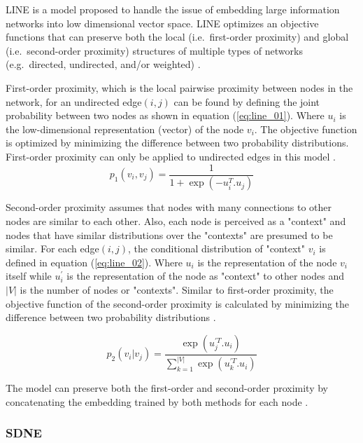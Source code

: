 \ac{LINE} is a model proposed to handle the issue of embedding large information networks into low dimensional vector space.
\ac{LINE} optimizes an objective functions that can preserve both the local (i.e.~first-order proximity) and global (i.e.~second-order proximity) structures of multiple types of networks (e.g.~directed, undirected, and/or weighted) \cite{tang_line:_2015}.

First-order proximity, which is the local pairwise proximity between nodes in the network, for an undirected edge$(i,j)$ can be found by defining the joint probability between two nodes as shown in equation (\ref{eq:line_01}).
Where $u_{i}$ is the low-dimensional representation (vector) of the node $v_{i}$.
The objective function is optimized by minimizing the difference between two probability distributions.
First-order proximity can only be applied to undirected edges in this model \cite{tang_line:_2015}.
\begin{equation}
    \label{eq:line_01}
    p_{1}(v_{i}, v_{j}) = \frac{1}{1+ \exp{(-u_{i}^T .u_{j})}}
\end{equation}

Second-order proximity assumes that nodes with many connections to other nodes are similar to each other.
Also, each node is perceived as a "context" and nodes that have similar distributions over the "contexts" are presumed to be similar.
For each edge$(i,j)$, the conditional distribution of "context" $v_{i}$ is defined in equation (\ref{eq:line_02}).
Where $u_{i}$ is the representation of the node $v_{i}$ itself while $u_{i}^{'}$ is the representation of the node as "context" to other nodes and $|V|$ is the number of nodes or "contexts".
Similar to first-order proximity, the objective function of the second-order proximity is calculated by minimizing the difference between two probability distributions \cite{tang_line:_2015}.

\begin{equation}
    \label{eq:line_02}
    p_{2}(v_{i}| v_{j}) = \frac{\exp(u_{j}^{'T} .u_{i})}{\sum_{k=1}^{|V|} \exp{(u_{k}^{'T} .u_{i})}}
\end{equation}

The model can preserve both the first-order and second-order proximity by concatenating the embedding trained by both methods for each node \cite{tang_line:_2015}.

\subsubsection{SDNE}\label{subsection:SDNE}


